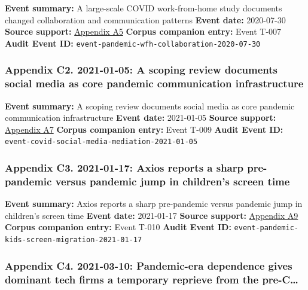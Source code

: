 \documentclass[
  american,
  11pt,
  letterpaper,
]{article}
\begin{document}
\textbf{Event summary:} A large-scale COVID work-from-home study
documents changed collaboration and communication patterns \textbf{Event
date:} 2020-07-30 \textbf{Source support:}
\hyperref[ch-03-appendix-a5-how-work-from-home-affects-collaboration-a-large-scale-study-of-information-workers-in-a-natural-experiment-during-covid-19]{Appendix
A5} \textbf{Corpus companion entry:} Event T-007 \textbf{Audit Event
ID:} \texttt{event-pandemic-wfh-collaboration-2020-07-30}

\subsubsection{Appendix C2. 2021-01-05: A scoping review documents
social media as core pandemic communication
infrastructure}\label{ch-03-appendix-c2-2021-01-05-a-scoping-review-documents-social-media-as-core-pandemic-communication-infrastructure}

\textbf{Event summary:} A scoping review documents social media as core
pandemic communication infrastructure \textbf{Event date:} 2021-01-05
\textbf{Source support:}
\hyperref[ch-03-appendix-a7-what-social-media-told-about-us-in-the-time-of-covid-19-a-scoping-review]{Appendix
A7} \textbf{Corpus companion entry:} Event T-009 \textbf{Audit Event
ID:} \texttt{event-covid-social-media-mediation-2021-01-05}

\subsubsection{Appendix C3. 2021-01-17: Axios reports a sharp
pre-pandemic versus pandemic jump in children's screen
time}\label{ch-03-appendix-c3-2021-01-17-axios-reports-a-sharp-pre-pandemic-versus-pandemic-jump-in-children-s-screen-time}

\textbf{Event summary:} Axios reports a sharp pre-pandemic versus
pandemic jump in children's screen time \textbf{Event date:} 2021-01-17
\textbf{Source support:}
\hyperref[ch-03-appendix-a9-kids-screen-time-up-50-during-pandemic]{Appendix
A9} \textbf{Corpus companion entry:} Event T-010 \textbf{Audit Event
ID:} \texttt{event-pandemic-kids-screen-migration-2021-01-17}

\subsubsection{Appendix C4. 2021-03-10: Pandemic-era dependence gives
dominant tech firms a temporary reprieve from the
pre-C\ldots{}}\label{ch-03-appendix-c4-2021-03-10-pandemic-era-dependence-gives-dominant-tech-firms-a-temporary-reprieve-from-the-pre-covid-techlash}
\end{document}

